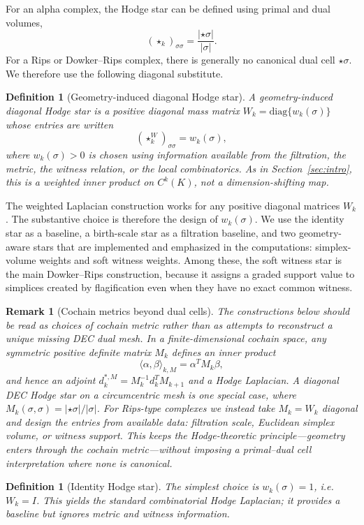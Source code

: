 \documentclass[11pt]{amsart}
\theoremstyle{plain}
\newtheorem{definition}[theorem]{Definition}
\newtheorem{remark}[theorem]{Remark}
\begin{document}
For an alpha complex, the Hodge star can be defined using primal and dual volumes,
\[
(\star_k)_{\sigma\sigma}
=
\frac{|\star\sigma|}{|\sigma|}.
\]
For a Rips or Dowker--Rips complex, there is generally no canonical dual cell $\star\sigma$. We
therefore use the following diagonal substitute.

\begin{definition}[Geometry-induced diagonal Hodge star]
A geometry-induced diagonal Hodge star is a positive diagonal mass matrix
$W_k=\mathrm{diag}\{w_k(\sigma)\}$ whose entries are written
\[
(\star_k^W)_{\sigma\sigma}
=
w_k(\sigma),
\]
where $w_k(\sigma)>0$ is chosen using information available from the filtration, the metric, the
witness relation, or the local combinatorics. As in Section~\ref{sec:intro}, this is a weighted
inner product on $C^k(K)$, not a dimension-shifting map.
\end{definition}

The weighted Laplacian construction works for any positive diagonal matrices $W_k$. The substantive
choice is therefore the design of $w_k(\sigma)$. We use the identity star as a baseline, a
birth-scale star as a filtration baseline, and two geometry-aware stars that are implemented and
emphasized in the computations: simplex-volume weights and soft witness weights. Among these, the
soft witness star is the main Dowker--Rips construction, because it assigns a graded support value
to simplices created by flagification even when they have no exact common witness.

\begin{remark}[Cochain metrics beyond dual cells]
The constructions below should be read as choices of cochain metric rather than as attempts to
reconstruct a unique missing DEC dual mesh. In a finite-dimensional cochain space, any symmetric
positive definite matrix $M_k$ defines an inner product
\[
\langle\alpha,\beta\rangle_{k,M}
=
\alpha^T M_k\beta,
\]
and hence an adjoint $d_k^{*,M}=M_k^{-1}d_k^T M_{k+1}$ and a Hodge Laplacian. A diagonal DEC
Hodge star on a circumcentric mesh is one special case, where
$M_k(\sigma,\sigma)=|\star\sigma|/|\sigma|$. For Rips-type complexes we instead take
$M_k=W_k$ diagonal and design the entries from available data: filtration scale, Euclidean simplex
volume, or witness support. This keeps the Hodge-theoretic principle---geometry enters through the
cochain metric---without imposing a primal--dual cell interpretation where none is canonical.
\end{remark}

\begin{definition}[Identity Hodge star]
The simplest choice is $w_k(\sigma)=1$, i.e.\ $W_k=I$. This yields the standard combinatorial
Hodge Laplacian; it provides a baseline but ignores metric and witness information.
\end{definition}
\end{document}
